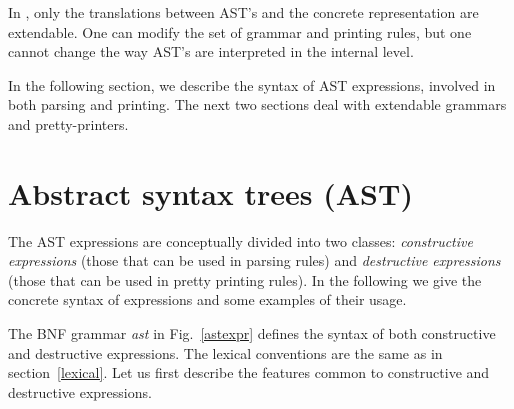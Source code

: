 In {\Coq}, only the translations between AST's and the concrete
representation are extendable. One can modify the set of grammar and
printing rules, but one cannot change the way AST's are interpreted in
the internal level.

In the following section, we describe the syntax of AST expressions,
involved in both parsing and printing. The next two sections deal with
extendable grammars and pretty-printers.

\section{Abstract syntax trees (AST)}

\label{astsyntax}

The AST expressions are conceptually divided into two classes:
\emph{constructive expressions} (those that can be used in parsing
rules) and \emph{destructive expressions} (those that can be used in
pretty printing rules). In the following we give the concrete syntax
of expressions and some examples of their usage.

The BNF grammar {\sl ast} in Fig.~\ref{astexpr} defines the syntax
of both constructive and destructive expressions. The lexical
conventions are the same as in section~\ref{lexical}. Let us first
describe the features common to constructive and destructive
expressions.

